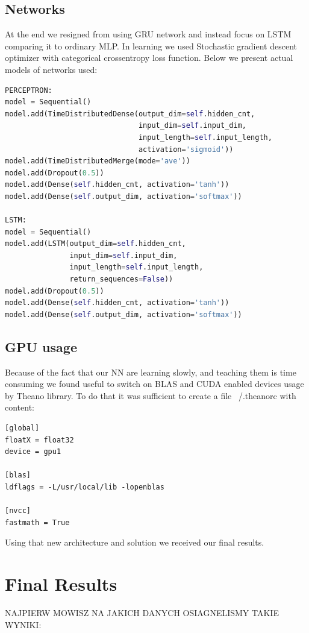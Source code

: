 \documentclass[twoside]{article}
\begin{document}
\begin{multicols}{2}
\subsection{Networks}
At the end we resigned from using GRU network and instead focus on LSTM comparing it to ordinary MLP.
In learning we used Stochastic gradient descent optimizer with categorical crossentropy loss function.
Below we present actual models of networks used:
\begin{lstlisting}[language=Python, frame=single, basicstyle=\tiny]
PERCEPTRON:
model = Sequential()
model.add(TimeDistributedDense(output_dim=self.hidden_cnt,
                               input_dim=self.input_dim,
                               input_length=self.input_length,
                               activation='sigmoid'))
model.add(TimeDistributedMerge(mode='ave'))
model.add(Dropout(0.5))
model.add(Dense(self.hidden_cnt, activation='tanh'))
model.add(Dense(self.output_dim, activation='softmax'))

LSTM:
model = Sequential()
model.add(LSTM(output_dim=self.hidden_cnt,
			   input_dim=self.input_dim,
			   input_length=self.input_length,
			   return_sequences=False))
model.add(Dropout(0.5))
model.add(Dense(self.hidden_cnt, activation='tanh'))
model.add(Dense(self.output_dim, activation='softmax'))
\end{lstlisting}

\subsection{GPU usage}
Because of the fact that our NN are learning slowly, and teaching them is time consuming we found
useful to switch on BLAS and CUDA enabled devices usage by Theano library. To do that it was sufficient to
create a file ~/.theanorc with content: \\
\begin{lstlisting}
[global]
floatX = float32
device = gpu1

[blas]
ldflags = -L/usr/local/lib -lopenblas

[nvcc]
fastmath = True
\end{lstlisting}

Using that new architecture and solution we received our final results.

\section{Final Results}

NAJPIERW MOWISZ NA JAKICH DANYCH OSIAGNELISMY TAKIE WYNIKI:


\end{multicols}
\end{document}
